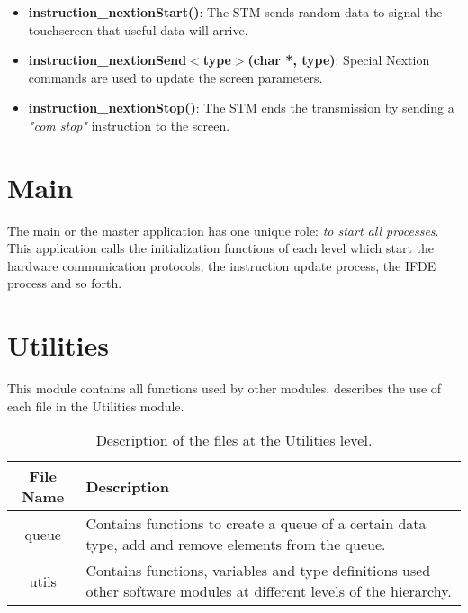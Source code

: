 \begin{itemize}
\item \textbf{instruction\_nextionStart()}: The STM sends random data to signal the touchscreen that useful data will arrive.
\item \textbf{instruction\_nextionSend$<$type$>$(char *, type)}: Special Nextion commands are used to update the screen parameters.
\item \textbf{instruction\_nextionStop()}: The STM ends the transmission by sending a \textit{"com stop"} instruction to the screen. 
\end{itemize}

\section{Main}
The main or the master application has one unique role: \textit{to start all processes}. This application calls the initialization functions of each level which start the hardware communication protocols, the instruction update process, the IFDE process and so forth. 

\section{Utilities}
This module contains all functions used by other modules.  describes the use of each file in the Utilities module.
\begin{table}[h!]
	\centering
	\caption{Description of the files at the Utilities level.}
	\label{table:utilities}
	\begin{tabular}{cp{30em}}
		\hline
		\hline
		\toprule
		\textbf{File Name} & \textbf{Description}\\
		\bottomrule
		\toprule
		queue & Contains functions to create a queue of a certain data type, add and remove elements from the queue. \\
		\midrule
		utils & Contains functions, variables and type definitions used other software modules at different levels of the hierarchy.\\
		\bottomrule
		\hline
		\hline
	\end{tabular}
\end{table}